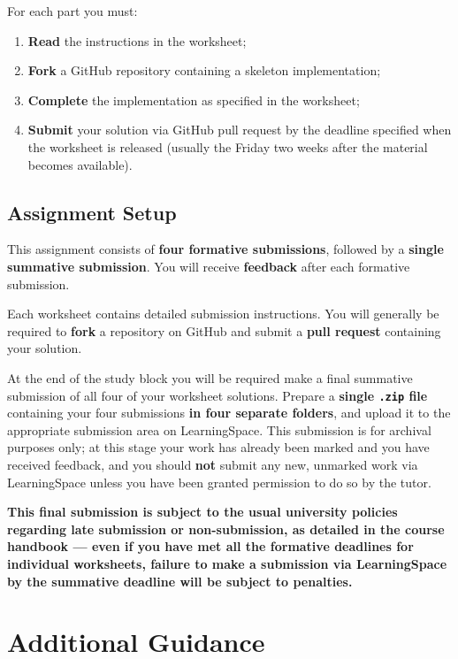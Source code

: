 \documentclass{../../fal_assignment}
\begin{document}
For each part you must:
\begin{enumerate}[label=(\roman*)]
	\item \textbf{Read} the instructions in the worksheet;
	\item \textbf{Fork} a GitHub repository containing a skeleton implementation;
	\item \textbf{Complete} the implementation as specified in the worksheet;
	\item \textbf{Submit} your solution via GitHub pull request by the deadline specified when the worksheet is released (usually the Friday two weeks after the material becomes available).
\end{enumerate}

\subsection*{Assignment Setup} 

This assignment consists of \textbf{four formative submissions}, followed by a \textbf{single summative submission}.
You will receive \textbf{feedback} after each formative submission.

Each worksheet contains detailed submission instructions. You will generally be required to \textbf{fork} a repository on GitHub and submit a \textbf{pull request} containing your solution.

At the end of the study block you will be required make a final summative submission of all four of your worksheet solutions.
Prepare a \textbf{single \texttt{.zip} file} containing your four submissions \textbf{in four separate folders}, and upload it to the appropriate submission area on LearningSpace. 
This submission is for archival purposes only; at this stage your work has already been marked and you have received feedback, and you should \textbf{not} submit any new, unmarked work via LearningSpace unless you have been granted permission to do so by the tutor.

\textbf{This final submission is subject to the usual university policies regarding late submission or non-submission,
as detailed in the course handbook ---
even if you have met all the formative deadlines for individual worksheets,
failure to make a submission via LearningSpace by the summative deadline will be subject to penalties.}

\section*{Additional Guidance}
\end{document}
